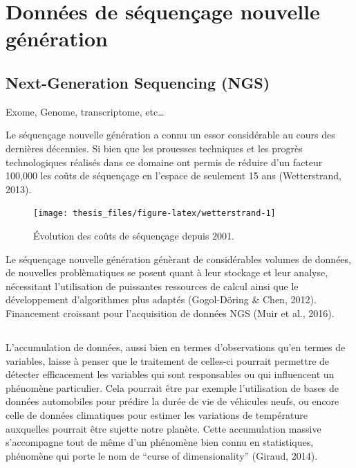 \documentclass[12pt,twoside]{ugathesis}
\begin{document}
  \section{Données de séquençage nouvelle
  génération}\label{donnees-de-sequencage-nouvelle-generation}
  
  \subsection{Next-Generation Sequencing
  (NGS)}\label{next-generation-sequencing-ngs}
  
  Exome, Genome, transcriptome, etc\ldots{}
  
  Le séquençage nouvelle génération a connu un essor considérable au cours
  des dernières décennies. Si bien que les prouesses techniques et les
  progrès technologiques réalisés dans ce domaine ont permis de réduire
  d'un facteur 100,000 les coûts de séquençage en l'espace de seulement 15
  ans (Wetterstrand, 2013).
  \begin{figure}
  
  {\centering \texttt{[image: thesis\_files/figure-latex/wetterstrand-1]} 
  
  }
  
  \caption{Évolution des coûts de séquençage depuis 2001.}\label{fig:wetterstrand}
  \end{figure}
  Le séquençage nouvelle génération génèrant de considérables volumes de
  données, de nouvelles problèmatiques se posent quant à leur stockage et
  leur analyse, nécessitant l'utilisation de puissantes ressources de
  calcul ainsi que le développement d'algorithmes plus adaptés
  (Gogol-Döring \& Chen, 2012). Financement croissant pour l'acquisition
  de données NGS (Muir et al., 2016).
  
  \subsection{}\label{section}
  
  L'accumulation de données, aussi bien en termes d'observations qu'en
  termes de variables, laisse à penser que le traitement de celles-ci
  pourrait permettre de détecter efficacement les variables qui sont
  responsables ou qui influencent un phénomène particulier. Cela pourrait
  être par exemple l'utilisation de bases de données automobiles pour
  prédire la durée de vie de véhicules neufs, ou encore celle de données
  climatiques pour estimer les variations de température auxquelles
  pourrait être sujette notre planète. Cette accumulation massive
  s'accompagne tout de même d'un phénomène bien connu en statistiques,
  phénomène qui porte le nom de ``curse of dimensionality'' (Giraud,
  2014).
  
\end{document}
